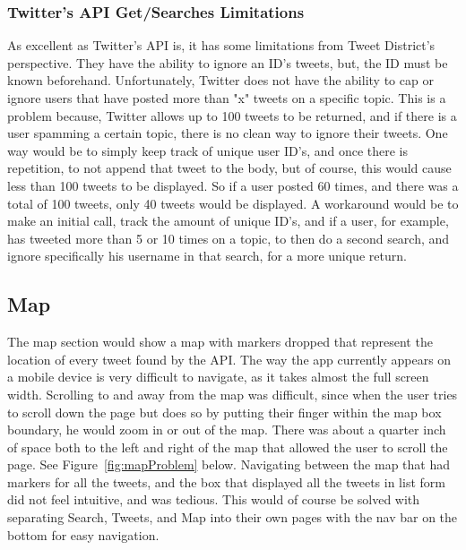 \documentclass[11pt]{article}
\begin{document}
\subsubsection{Twitter's API Get/Searches Limitations}

As excellent as Twitter's API is, it has some limitations from Tweet District's perspective. They have the ability to ignore an ID's tweets, but, the ID must be known beforehand. Unfortunately, Twitter does not have the ability to cap or ignore users that have posted more than "x" tweets on a specific topic. This is a problem because, Twitter allows up to 100 tweets to be returned, and if there is a user spamming a certain topic, there is no clean way to ignore their tweets. One way would be to simply keep track of unique user ID's, and once there is repetition, to not append that tweet to the body, but of course, this would cause less than 100 tweets to be displayed. So if a user posted 60 times, and there was a total of 100 tweets, only 40 tweets would be displayed. A workaround would be to make an initial call, track the amount of unique ID's, and if a user, for example, has tweeted more than 5 or 10 times on a topic, to then do a second search, and ignore specifically his username in that search, for a more unique return.


\subsection{Map}
The map section would show a map with markers dropped that represent the location of every tweet found by the API. The way the app currently appears on a mobile device is very difficult to navigate, as it takes almost the full screen width. Scrolling to and away from the map was difficult, since when the user tries to scroll down the page but does so by putting their finger within the map box boundary, he would zoom in or out of the map. There was about a quarter inch of space both to the left and right of the map that allowed the user to scroll the page.  See Figure~\ref{fig:mapProblem} below. Navigating between the map that had markers for all the tweets, and the box that displayed all the tweets in list form did not feel intuitive, and was tedious. This would of course be solved with separating Search, Tweets, and Map into their own pages with the nav bar on the bottom for easy navigation.
\end{document}
